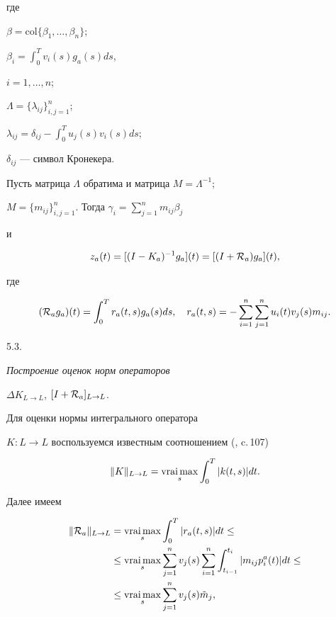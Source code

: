 %


где


$\beta = {\mathrm {col}}\{ \beta_1, \dotsc, \beta_{n}\}$;


$\beta_i = \int_0^T v_i(s)g_a(s) ds$,


$i=1, \dotsc, n$;


$\Lambda = \{ \lambda_{ij} \}_{i,j=1}^{n}$;


$\lambda_{ij} = \delta_{ij}-\int_0^T u_j(s) v_i(s) ds$;


$\delta_{ij}$ --- символ Кронекера.





Пусть матрица $\Lambda$ обратима и матрица $M=\Lambda^{-1}$;


$M =\{m_{ij}\}_{i,j=1}^{n}$. Тогда $\gamma_i = \sum_{j=1}^{n}m_{ij} \beta_j$


и


%


$$


z_a(t)=[(I-K_a )^{-1} g_a] (t) =


[(I+{\cal R}_a )  g_a ] (t),


$$


%


где


%


$$


({\cal R}_ag_a ) (t) = \int_0^T r_a(t,s) g_a(s)


ds, \quad r_a(t,s) = -\sum_{i=1}^{n} \sum_{j=1}^{n}


u_i(t) v_j(s) m_{ij}.


$$


%





5.3. {\it Построение оценок норм операторов


$\Delta K _{L \to L}$, $[I+{\cal R}_a]_{L \to L}$.}


Для оценки нормы интегрального оператора


$K:L \to L$ воспользуемся известным соотношением (\cite{Zab}, c.\,107)


%


$$


\| K \| _{L \to L} = \vraimax_s \int_0^T |k(t,s)| dt.


$$


%


Далее имеем


%


\begin{align*}


\| {\cal R}_a \| _{L \to L} &


=  \vraimax_s \int_0^T |r_a(t,s)| dt \le \\


& \le  \vraimax_s \sum_{j=1}^{n} v_j(s)\sum_{i=1}^{n}


\int_{t_{i-1}}^{t_i} |m_{ij} p_i^a (t)| dt \le \\


& \le \vraimax_s \sum_{j=1}^{n} v_j(s) \Tilde m_j,


\end{align*}


